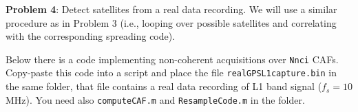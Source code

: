 \documentclass[11pt]{article}
\begin{document}
\pagebreak

\textbf{Problem 4}:
Detect satellites from a real data recording. We will use a similar procedure as in Problem 3 (i.e., looping over possible satellites and correlating with the corresponding spreading code). 

Below there is a code implementing non-coherent acquisitions over \verb|Nnci| CAFs. Copy-paste this code into a script and place the file \verb|realGPSL1capture.bin| in the same folder, that file contains a real data recording of L1 band signal ($f_s=10$ MHz). You need also \verb|computeCAF.m| and \verb|ResampleCode.m| in the folder.

% 
% 
% 
% 
% 
% 
%     
%     
%         
\end{document}

